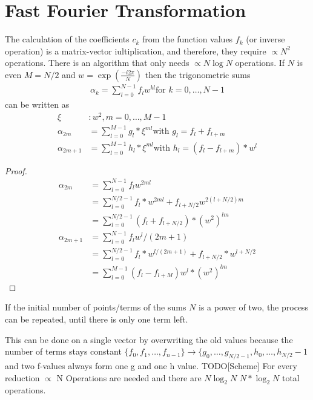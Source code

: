 \section{Fast Fourier Transformation}\label{sec:fast-fourier-transformation}
The calculation of the coefficients $c_k$ from the function values
$f_k$ (or inverse operation) is a matrix-vector iultiplication, and therefore,
they require $ \propto N^2$ operations.
There is an algorithm that only needs $\propto N \log N$ operations.
If $N$ is even $M = N/2$ and $w = \exp\left(\frac{-i 2 \pi }{N}\right)$ then the trigonometric
sums
\begin{align*}
    \alpha_k = \sum_{l=0}^{N-1} f_l w^{kl} \text{for } k = 0, \ldots, N-1
\end{align*}
can be written as
\begin{align*}
    \xi&: w^2, m = 0, \ldots, M-1\\
    \alpha_{2m} &= \sum_{l=0}^{M-1} g_l * \xi ^{ml} \text{with } g_l = f_l + f_{l+m}\\
    \alpha_{2m+1} &= \sum_{l=0}^{M-1} h_l * \xi^{ml} \text{with } h_l = (f_l - f_{l+m}) * w^l
\end{align*}
\begin{proof}
    \begin{align*}
        \alpha_{2m} &= \sum_{l=0}^{N-1} f_l w^{2ml}\\
        &= \sum_{l=0}^{N/2-1}f_l * w^{2ml} + f_{l + N/2} w^{2(l+N/2)m}\\
        &= \sum_{l=0}^{N/2-1}(f_l + f_{l+N/2}) * (w^2)^{lm}\\
        \alpha_{2m+1} &= \sum_{l=0}^{N-1} f_l w^l/(2m+1)\\
        &= \sum_{l=0}^{N/2-1} f_{l} * w^{l/(2m+1)}+ f_{l + N/2} * w^{l + N/2}\\
        &= \sum_{l=0}^{M-1} (f_l- f_{l+M}) w^l * (w^2)^{lm}
    \end{align*}
\end{proof}
If the initial number of points/terms of the sums $N$ is a power of two, the process can be repeated,
until there is only one term left.

This can be done on a single vector by overwriting the old values because the number of terms
stays constant $\{ f_0, f_1, \ldots, f_{n-1} \} \to \{ g_0, \ldots, g_{N/2-1}, h_0, \ldots, h_{N/2}-1$
and two f-values always form one g and one h value.
TODO[Scheme]
For every reduction $\propto $ N Operations are needed and there are $ N \log_{2} N$ \textrightarrow
$N * \log_2 N$ total operations.

